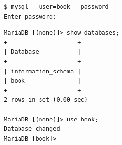 \documentclass{assignment}
\begin{document}
\begin{verbatim}
$ mysql --user=book --password
Enter password: 
\end{verbatim} 


\begin{verbatim}
MariaDB [(none)]> show databases;
+--------------------+
| Database           |
+--------------------+
| information_schema |
| book               |
+--------------------+
2 rows in set (0.00 sec)

MariaDB [(none)]> use book;
Database changed
MariaDB [book]> 

\end{verbatim}

 \label{Βιβλιογραφία}



\newpage
\end{document}
